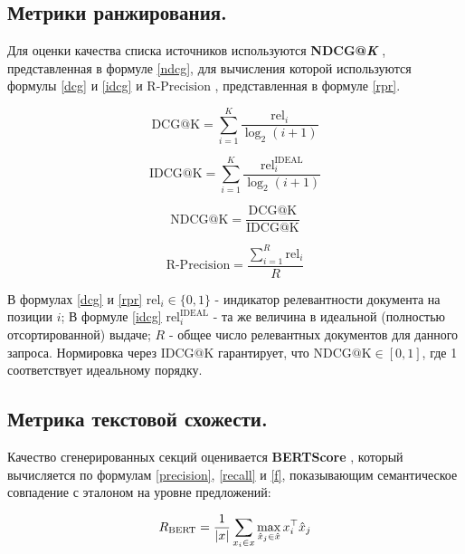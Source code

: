 \documentclass{article}
\theoremstyle{definition}
\theoremstyle{plain}
\begin{document}
\subsection*{Метрики ранжирования.}

Для оценки качества списка источников используются \textbf{NDCG@\textit{K}} \cite{ndcg}, представленная в формуле \eqref{ndcg}, для вычисления которой используются формулы \eqref{dcg} и \eqref{idcg} и $\mathrm{R\text{-}Precision}$ \cite{rprecision}, 
представленная в формуле \eqref{rpr}.

\begin{equation}\label{dcg}
\mathrm{DCG@K}= \sum_{i=1}^{K} \frac{\mathrm{rel}_i}{\log_2(i+1)}
\end{equation}

\begin{equation}\label{idcg}
\mathrm{IDCG@K}= \sum_{i=1}^{K} \frac{\mathrm{rel}^{\mathrm{IDEAL}}_i}{\log_2(i+1)}
\end{equation}

\begin{equation}\label{ndcg}
\mathrm{NDCG@K}= \frac{\mathrm{DCG@K}}{\mathrm{IDCG@K}}
\end{equation}

\begin{equation}\label{rpr}
\mathrm{R\text{-}Precision}= \frac{\sum_{i=1}^{R} \mathrm{rel}_i}{R}
\end{equation}

В формулах \eqref{dcg} и \eqref{rpr} \(\mathrm{rel}_i\in\{0,1\}\) - индикатор релевантности документа на позиции \(i\);  
В формуле \eqref{idcg} \(\mathrm{rel}^{\mathrm{IDEAL}}_i\) - та же величина в идеальной (полностью отсортированной) выдаче;  
\(R\) - общее число релевантных документов для данного запроса.  
Нормировка через \(\mathrm{IDCG@K}\) гарантирует, что \(\mathrm{NDCG@K}\in[0,1]\), где 1 соответствует идеальному порядку.

\subsection*{Метрика текстовой схожести.}

Качество сгенерированных секций оценивается \textbf{BERTScore} \cite{bertscore}, который вычисляется по формулам \eqref{precision}, \eqref{recall} и \eqref{f}, показывающим семантическое совпадение с эталоном на уровне предложений:

\begin{equation}\label{precision}
R_{\mathrm{BERT}}= \frac{1}{|x|}\sum_{x_i\in x}\max_{\hat{x}_j\in\hat{x}} x_i^\top \hat{x}_j\\
\end{equation}
\end{document}
